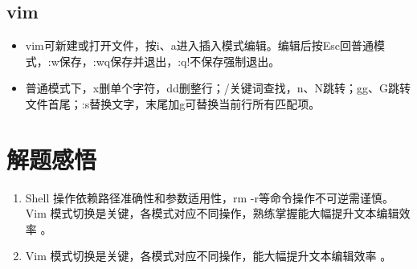 \documentclass[10.5pt]{ctexart}
\begin{document}
\subsection{vim}
\begin{itemize}
\item vim可新建或打开文件，按i、a进入插入模式编辑。编辑后按Esc回普通模式，:w保存，:wq保存并退出，:q!不保存强制退出。
\item 普通模式下，x删单个字符，dd删整行；/关键词查找，n、N跳转；gg、G跳转文件首尾；:s替换文字，末尾加g可替换当前行所有匹配项。
\end{itemize}

\section{解题感悟}
\begin{enumerate}
    \item Shell 操作依赖路径准确性和参数适用性，rm -r等命令操作不可逆需谨慎。Vim 模式切换是关键，各模式对应不同操作，熟练掌握能大幅提升文本编辑效率 。
    \item Vim 模式切换是关键，各模式对应不同操作，能大幅提升文本编辑效率 。
\end{enumerate}
\end{document}
